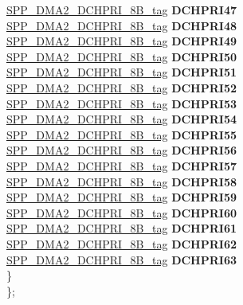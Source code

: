 \begin{DoxyCompactItemize}
\begin{tabbing}
\>\>\mbox{\hyperlink{unionSPP__DMA2__DCHPRI__8B__tag}{SPP\_DMA2\_DCHPRI\_8B\_tag}} {\bfseries DCHPRI47}\\
\>\>\mbox{\hyperlink{unionSPP__DMA2__DCHPRI__8B__tag}{SPP\_DMA2\_DCHPRI\_8B\_tag}} {\bfseries DCHPRI48}\\
\>\>\mbox{\hyperlink{unionSPP__DMA2__DCHPRI__8B__tag}{SPP\_DMA2\_DCHPRI\_8B\_tag}} {\bfseries DCHPRI49}\\
\>\>\mbox{\hyperlink{unionSPP__DMA2__DCHPRI__8B__tag}{SPP\_DMA2\_DCHPRI\_8B\_tag}} {\bfseries DCHPRI50}\\
\>\>\mbox{\hyperlink{unionSPP__DMA2__DCHPRI__8B__tag}{SPP\_DMA2\_DCHPRI\_8B\_tag}} {\bfseries DCHPRI51}\\
\>\>\mbox{\hyperlink{unionSPP__DMA2__DCHPRI__8B__tag}{SPP\_DMA2\_DCHPRI\_8B\_tag}} {\bfseries DCHPRI52}\\
\>\>\mbox{\hyperlink{unionSPP__DMA2__DCHPRI__8B__tag}{SPP\_DMA2\_DCHPRI\_8B\_tag}} {\bfseries DCHPRI53}\\
\>\>\mbox{\hyperlink{unionSPP__DMA2__DCHPRI__8B__tag}{SPP\_DMA2\_DCHPRI\_8B\_tag}} {\bfseries DCHPRI54}\\
\>\>\mbox{\hyperlink{unionSPP__DMA2__DCHPRI__8B__tag}{SPP\_DMA2\_DCHPRI\_8B\_tag}} {\bfseries DCHPRI55}\\
\>\>\mbox{\hyperlink{unionSPP__DMA2__DCHPRI__8B__tag}{SPP\_DMA2\_DCHPRI\_8B\_tag}} {\bfseries DCHPRI56}\\
\>\>\mbox{\hyperlink{unionSPP__DMA2__DCHPRI__8B__tag}{SPP\_DMA2\_DCHPRI\_8B\_tag}} {\bfseries DCHPRI57}\\
\>\>\mbox{\hyperlink{unionSPP__DMA2__DCHPRI__8B__tag}{SPP\_DMA2\_DCHPRI\_8B\_tag}} {\bfseries DCHPRI58}\\
\>\>\mbox{\hyperlink{unionSPP__DMA2__DCHPRI__8B__tag}{SPP\_DMA2\_DCHPRI\_8B\_tag}} {\bfseries DCHPRI59}\\
\>\>\mbox{\hyperlink{unionSPP__DMA2__DCHPRI__8B__tag}{SPP\_DMA2\_DCHPRI\_8B\_tag}} {\bfseries DCHPRI60}\\
\>\>\mbox{\hyperlink{unionSPP__DMA2__DCHPRI__8B__tag}{SPP\_DMA2\_DCHPRI\_8B\_tag}} {\bfseries DCHPRI61}\\
\>\>\mbox{\hyperlink{unionSPP__DMA2__DCHPRI__8B__tag}{SPP\_DMA2\_DCHPRI\_8B\_tag}} {\bfseries DCHPRI62}\\
\>\>\mbox{\hyperlink{unionSPP__DMA2__DCHPRI__8B__tag}{SPP\_DMA2\_DCHPRI\_8B\_tag}} {\bfseries DCHPRI63}\\
\>\} \\
\}; \\


\end{tabbing}
\end{DoxyCompactItemize}
